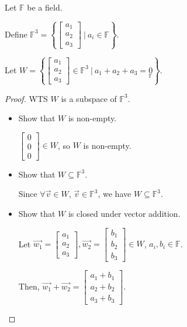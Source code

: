 \documentclass[11pt,fleqn]{book} %
\begin{document}
\begin{example}
    Let $\mathbb{F}$ be a field. 
    
    Define $\mathbb{F}^3 = \left\{ \begin{bmatrix} a_1\\a_2\\a_3 \end{bmatrix} ~|~ a_i \in \mathbb{F} \right\}$. 
    
    Let $W = \left\{ \begin{bmatrix}a_1\\a_2\\a_3\end{bmatrix} \in \mathbb{F}^3 ~|~ a_1+a_2+a_3=\underset{\mathbb{F}}{0} \right\}$. 
    
    \begin{proof}
        WTS $W$ is a subspace of $\mathbb{F}^3$. 
        
        \begin{itemize}
            \item Show that $W$ is non-empty. 

            $\begin{bmatrix} 0\\0\\0 \end{bmatrix} \in W$, so $W$ is non-empty. 

            \item Show that $W \subseteq \mathbb{F}^3$. 
            
            Since $\forall \overrightarrow{v} \in W$, $\overrightarrow{v} \in \mathbb{F}^3$, we have $W \subseteq \mathbb{F}^3$. 
            
            \item Show that $W$ is closed under vector addition. 

            Let $\overrightarrow{w_1} = \begin{bmatrix}a_1\\a_2\\a_3\end{bmatrix}, \overrightarrow{w_2} = \begin{bmatrix}b_1\\b_2\\b_3\end{bmatrix} \in W$, $a_i,b_i \in \mathbb{F}$. 
            
            Then, $\overrightarrow{w_1} + \overrightarrow{w_2} = \begin{bmatrix}a_1+b_1\\a_2+b_2\\a_3+b_3\end{bmatrix}$. 
            

\end{itemize}
\end{proof}
\end{example}
\end{document}
